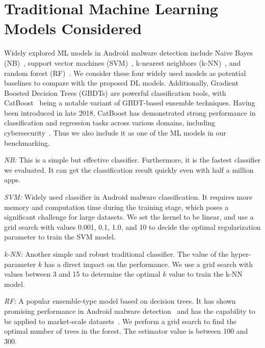\section{Traditional Machine Learning Models Considered}
\label{sec:alternative_ml}

Widely explored ML models in Android malware detection
include Naive Bayes (NB)~\cite{Yerima:AINA13, Sharma:CANS14}, support
vector machines (SVM)~\cite{Gascon:AISec13, Arp:NDSS14}, k-nearest
neighbors (k-NN)~\cite{Wu:AsiaJCIS12, Sharma:CANS14}, and random
forest (RF)~\cite{Mariconti:NDSS2017}.  We consider these four widely
used models as potential baselines to compare with the proposed
DL models.  Additionally, Gradient
Boosted Decision Trees (GBDTs) are powerful classification tools, with
CatBoost~\cite{CatBoost:NEURIPS2018} being a notable variant of
GBDT-based ensemble techniques. 
Having been introduced in late 2018, CatBoost has demonstrated strong
performance in classification and regression tasks across various
domains, including cybersecurity~\cite{CatBoost:NEURIPS2018}. Thus we also include
it as one of the ML models in our benchmarking. %

\textit{NB:} This is a simple but effective classifier. Furthermore,
it is the fastest classifier we evaluated. It can get the
classification result quickly even with half a million apps.

    \textit{SVM:} Widely used classifier in Android malware
classification. It requires more memory and computation time during
the training stage, which poses a significant challenge for
large datasets. We set the kernel to be linear, and use a grid
search with values 0.001, 0.1, 1.0, and 10 to decide the optimal
regularization parameter to train the SVM model.

    \textit{k-NN:} Another simple and robust traditional
classifier. The value of the hyper-parameter \(k\) has a direct impact
on the performance. We use a grid search with values between 3 and 15
to determine the optimal \(k\) value to train the k-NN model.

    \textit{RF:} A popular ensemble-type model based on decision
trees. It has shown promising performance in Android malware
detection~\cite{Mariconti:NDSS2017} and has the capability to be
applied to market-scale datasets~\cite{Gong:EuroSys20}. We perform a
grid search to find the optimal number of trees in the forest. The
estimator value is between 100 and 300.


